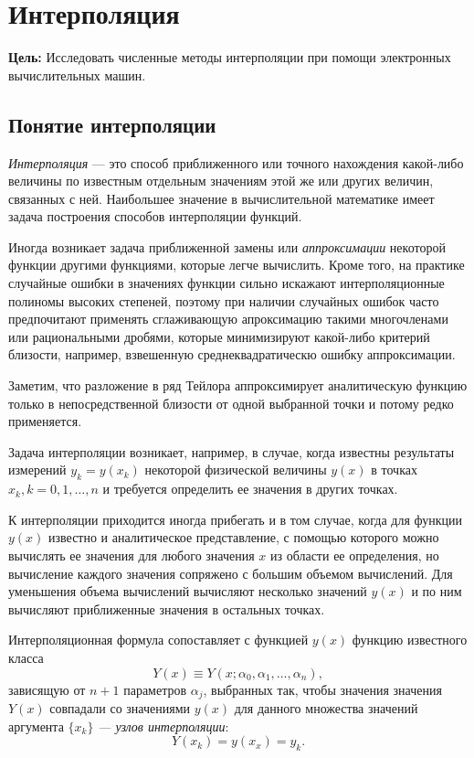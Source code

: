 \section{Интерполяция}

\noindent \textbf{Цель:} Исследовать численные методы интерполяции
при помощи электронных вычислительных машин.

\medskip{}



\subsection{Понятие интерполяции}

\emph{Интерполяция} --- это способ приближенного или точного нахождения
какой-либо величины по известным отдельным значениям этой же или других
величин, связанных с ней. Наибольшее значение в вычислительной математике
имеет задача построения способов интерполяции функций.

Иногда возникает задача приближенной замены или \emph{аппроксимации}\emph{
}некоторой функции другими функциями, которые легче вычислить. Кроме
того, на практике случайные ошибки в значениях функции сильно искажают
интерполяционные полиномы высоких степеней, поэтому при наличии случайных
ошибок часто предпочитают применять сглаживающую апроксимацию такими
многочленами или рациональными дробями, которые минимизируют какой-либо
критерий близости, например, взвешенную среднеквадратическю ошибку
аппроксимации.

Заметим, что разложение в ряд Тейлора аппроксимирует аналитическую
функцию только в непосредственной близости от одной выбранной точки
и потому редко применяется.

Задача интерполяции возникает, например, в случае, когда известны
результаты измерений $y_{k}=y(x_{k})$ некоторой физической величины
$y(x)$ в точках $x_{k},k=0,1,\dots,n$ и требуется определить ее
значения в других точках. 

К интерполяции приходится иногда прибегать и в том случае, когда для
функции $y(x)$ известно и аналитическое представление, с помощью
которого можно вычислять ее значения для любого значения $x$ из области
ее определения, но вычисление каждого значения сопряжено с большим
объемом вычислений. Для уменьшения объема вычислений вычисляют несколько
значений $y(x)$ и по ним вычисляют приближенные значения в остальных
точках.

Интерполяционная формула сопоставляет с функцией $y(x)$ функцию известного
класса 
\[
Y(x)\equiv Y(x;\alpha_{0},\alpha_{1},\dots,\alpha_{n}),
\]
зависящую от $n+1$ параметров $\alpha_{j}$, выбранных так, чтобы
значения значения $Y(x)$ совпадали со значениями $y(x)$ для данного
множества значений аргумента $\{x_{k}\}$ \emph{--- узлов интерполяции}:
\[
Y(x_{k})=y(x_{x})=y_{k}.
\]



